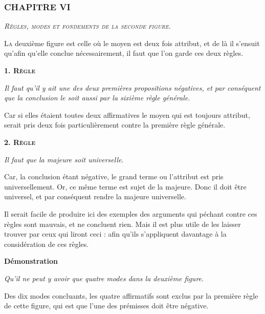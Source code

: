 \subsubsection{\centering \Large CHAPITRE VI}
\begin{center}\emph{\large\scshape Règles, modes et fondements de la seconde figure.}\end{center}

	\lettrine{L}{a} deuxième figure est celle où le moyen est deux fois attribut, et de là il s'ensuit qu'afin qu'elle conclue nécessairement, il faut que l'on garde ces deux règles.

\begin{center}{\bfseries\scshape\large 1. Règle}\end{center}

	\emph{Il faut qu'il y ait une des deux premières propositions négatives, et par conséquent que la conclusion le soit aussi par la sixième règle générale}.

Car si elles étaient toutes deux affirmatives le moyen qui est toujours attribut, serait pris deux fois particulièrement contre la première règle générale.

\begin{center}{\bfseries\scshape\large 2. Règle}\end{center}

	\emph{Il faut que la majeure soit universelle}.

Car, la conclusion étant négative, le grand terme ou l'attribut est pris universellement. Or, ce même terme est sujet de la majeure. Donc il doit être universel, et par conséquent rendre la majeure universelle.

Il serait facile de produire ici des exemples des arguments qui péchant contre ces règles sont mauvais, et ne concluent rien. Mais il est plus utile de les laisser trouver par ceux qui liront ceci : afin qu'ils s'appliquent davantage à la considération de ces règles.

\begin{center}{\bfseries Démonstration}\end{center}

\emph{Qu'il ne peut y avoir que quatre modes dans la deuxième figure}.

Des dix modes concluants, les quatre affirmatifs sont exclus par la première règle de cette figure, qui est que l'une des prémisses doit être négative.

